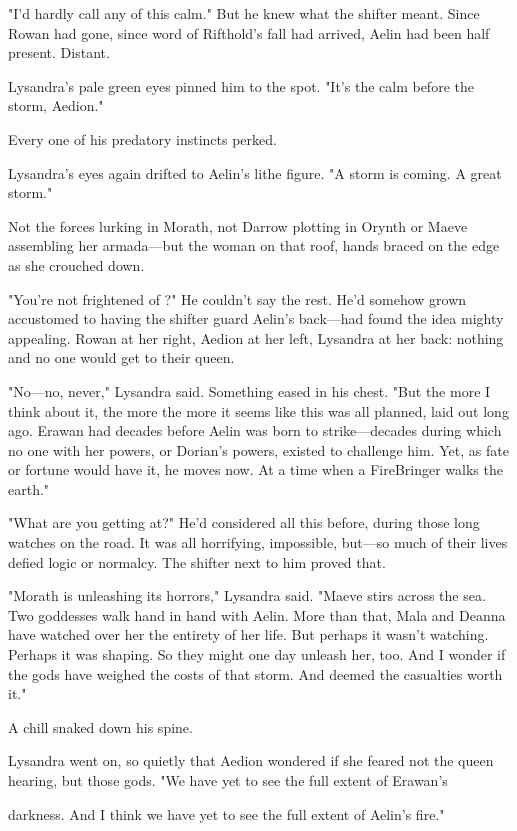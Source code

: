 "I'd hardly call any of this calm." But he knew what the shifter meant. Since Rowan had gone, since word of Rifthold's fall had arrived, Aelin had been half present. Distant.

Lysandra's pale green eyes pinned him to the spot. "It's the calm before the storm, Aedion."

Every one of his predatory instincts perked.

Lysandra's eyes again drifted to Aelin's lithe figure. "A storm is coming. A great storm."

Not the forces lurking in Morath, not Darrow plotting in Orynth or Maeve assembling her armada---but the woman on that roof, hands braced on the edge as she crouched down.

"You're not frightened of  ?" He couldn't say the rest. He'd somehow grown accustomed to having the shifter guard Aelin's back---had found the idea mighty appealing. Rowan at her right, Aedion at her left, Lysandra at her back: nothing and no one would get to their queen.

"No---no, never," Lysandra said. Something eased in his chest. "But the more I think about it, the more  the more it seems like this was all planned, laid out long ago. Erawan had decades before Aelin was born to strike---decades during which no one with her powers, or Dorian's powers, existed to challenge him. Yet, as fate or fortune would have it, he moves now. At a time when a FireBringer walks the earth."

"What are you getting at?" He'd considered all this before, during those long watches on the road. It was all horrifying, impossible, but---so much of their lives defied logic or normalcy. The shifter next to him proved that.

"Morath is unleashing its horrors," Lysandra said. "Maeve stirs across the sea. Two goddesses walk hand in hand with Aelin. More than that, Mala and Deanna have watched over her the entirety of her life. But perhaps it wasn't watching. Perhaps it was  shaping. So they might one day unleash her, too. And I wonder if the gods have weighed the costs of that storm. And deemed the casualties worth it."

A chill snaked down his spine.

Lysandra went on, so quietly that Aedion wondered if she feared not the queen hearing, but those gods. "We have yet to see the full extent of Erawan's

darkness. And I think we have yet to see the full extent of Aelin's fire."

